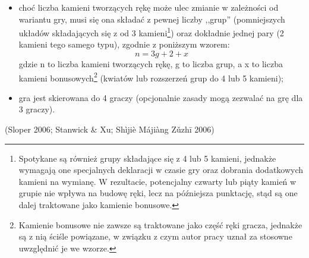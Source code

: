 \begin{enumerate}[label={\alph*)}]
\begin{itemize}
	  \item choć liczba kamieni tworzących rękę może ulec zmianie w zależności od
	  wariantu gry, musi się ona składać z pewnej liczby ,,grup'' (pomniejszych
	  układów składających się z od 3 kamieni\footnote{Spotykane są również grupy
	  składające się z 4 lub 5 kamieni, jednakże wymagają one specjalnych
	  deklaracji w czasie gry oraz dobrania dodatkowych kamieni na wymianę. W
	  rezultacie, potencjalny czwarty lub piąty kamień w grupie nie wpływa na
	  budowę ręki, lecz na późniejsza punktację, stąd są one dalej traktowane
	  jako kamienie bonusowe.}) oraz dokładnie jednej pary (2 kamieni tego samego
	  typu), zgodnie z poniższym wzorem:
	  \begin{equation*}
	  n = 3g + 2 + x
	  \end{equation*}
	  gdzie n to liczba kamieni tworzących rękę, g to liczba grup, a x to liczba
	  kamieni bonusowych\footnote{Kamienie bonusowe nie zawsze są traktowane jako
	  część ręki gracza, jednakże są z nią ściśle powiązane, w związku z czym
	  autor pracy uznał za stosowne uwzględnić je we wzorze.} (kwiatów lub
	  rozszerzeń grup do 4 lub 5 kamieni);
	  \item gra jest skierowana do 4 graczy (opcjonalnie zasady mogą
	  zezwalać na grę dla 3 graczy).
	\end{itemize} 
\end{enumerate}
(Sloper 2006; Stanwick \& Xu; Shìjiè Májiàng Zǔzhī 2006)
